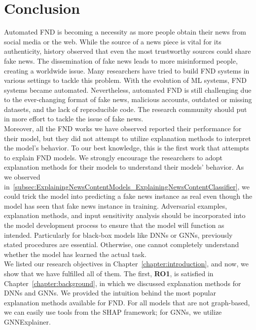 
\chapter{Conclusion}\label{chapter:conclusion}
Automated FND is becoming a necessity as more people obtain their news from social media or the web. While the source of a news piece is vital for its authenticity, history observed that even the most trustworthy sources could share fake news. The dissemination of fake news leads to more misinformed people, creating a worldwide issue. Many researchers have tried to build FND systems in various settings to tackle this problem. With the evolution of ML systems, FND systems became automated. Nevertheless, automated FND is still challenging due to the ever-changing format of fake news, malicious accounts, outdated or missing datasets, and the lack of reproducible code. The research community should put in more effort to tackle the issue of fake news.\\
Moreover, all the FND works we have observed reported their performance for their model, but they did not attempt to utilize explanation methods to interpret the model's behavior. To our best knowledge, this is the first work that attempts to explain FND models. We strongly encourage the researchers to adopt explanation methods for their models to understand their models' behavior. As we observed in~\ref{subsec:ExplainingNewsContentModels_ExplainingNewsContentClassifier}, we could trick the model into predicting a fake news instance as real even though the model has seen that fake news instance in training. Adversarial examples, explanation methods, and input sensitivity analysis should be incorporated into the model development process to ensure that the model will function as intended. Particularly for black-box models like DNNs or GNNs, previously stated procedures are essential. Otherwise, one cannot completely understand whether the model has learned the actual task.\\
We listed our research objectives in Chapter~\ref{chapter:introduction}, and now, we show that we have fulfilled all of them. The first, \textbf{RO1}, is satisfied in Chapter~\ref{chapter:background}, in which we discussed explanation methods for DNNs and GNNs. We provided the intuition behind the most popular explanation methods available for FND. For all models that are not graph-based, we can easily use tools from the SHAP framework; for GNNs, we utilize GNNExplainer. \\
